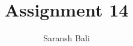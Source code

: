 \documentclass[journal,12pt,twocolumn]{IEEEtran}
\begin{document}
	\makeatletter
	\makeatother
	\let\StandardTheFigure\thefigure
	\let\vec\mathbf
	\renewcommand{\thefigure}{\theproblem}
	\def\putbox#1#2#3{\makebox[0in][l]{\makebox[#1][l]{}\raisebox{\baselineskip}[0in][0in]{\raisebox{#2}[0in][0in]{#3}}}}
	\def\rightbox#1{\makebox[0in][r]{#1}}
	\def\centbox#1{\makebox[0in]{#1}}
	\def\topbox#1{\raisebox{-\baselineskip}[0in][0in]{#1}}
	\def\midbox#1{\raisebox{-0.5\baselineskip}[0in][0in]{#1}}
	\vspace{3cm}
	\title{Assignment 14}
	\author{Saransh Bali}
\end{document}
